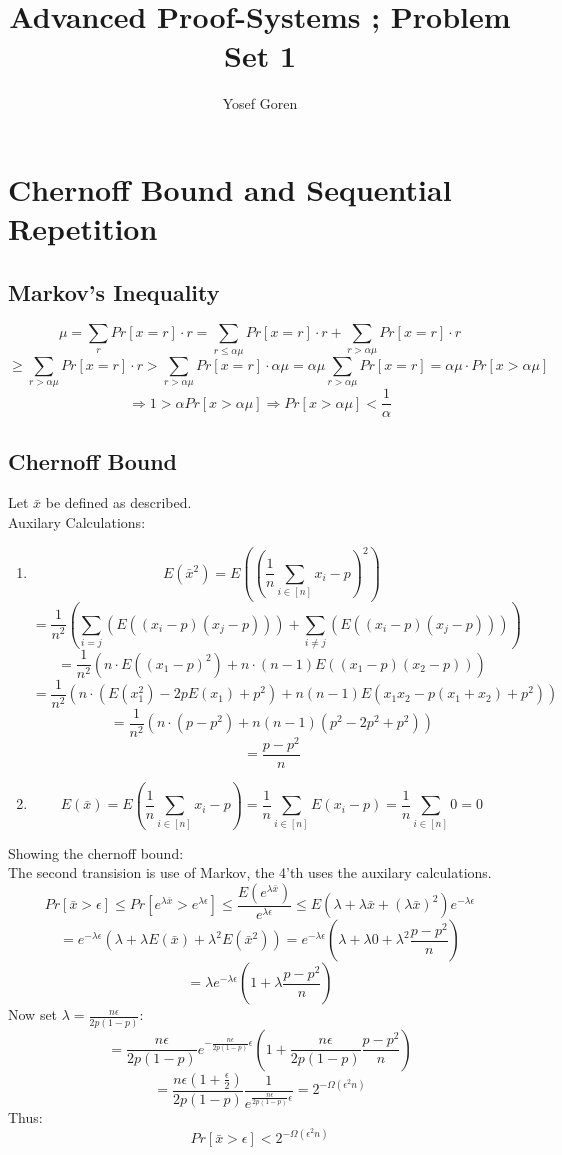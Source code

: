 \documentclass{article}
\begin{document}
\author{Yosef Goren}
\title{Advanced Proof-Systems ; Problem Set 1}
\maketitle

\section{Chernoff Bound and Sequential Repetition}
\subsection{Markov's Inequality}
\[
    \mu = \sum_rPr[x=r]\cdot r
    = \sum_{r\leq \alpha\mu}Pr[x=r]\cdot r + \sum_{r>\alpha\mu}Pr[x=r]\cdot r\]\[
    \geq \sum_{r>\alpha\mu}Pr[x=r]\cdot r> \sum_{r>\alpha\mu}Pr[x=r]\cdot \alpha\mu
    =\alpha\mu\sum_{r>\alpha\mu}Pr[x=r]
    = \alpha\mu\cdot Pr[x>\alpha\mu]\]\[
    \Rightarrow 1>\alpha Pr[x>\alpha\mu]
    \Rightarrow Pr[x>\alpha\mu] < \frac{1}{\alpha}
\]

\subsection{Chernoff Bound}
Let $\bar{x}$ be defined as described.\\
Auxilary Calculations:
\begin{enumerate}
    \item 
    \[
        E(\bar{x}^2)=E((\frac{1}{n}\sum_{i\in[n]}x_i-p)^2)
    \]\[
        =\frac{1}{n^2}(\sum_{i=j}(E((x_i-p)(x_j-p)))+\sum_{i\neq j}(E((x_i-p)(x_j-p))))
    \]\[
        =\frac{1}{n^2}(n\cdot E((x_1-p)^2)
        +n\cdot (n-1)E((x_1-p)(x_2-p)))
    \]\[
        =\frac{1}{n^2}(n\cdot (E(x_1^2)-2pE(x_1)+p^2)
        +n(n-1)E(x_1x_2-p(x_1+x_2)+p^2))
    \]\[
        =\frac{1}{n^2}(n\cdot (p-p^2)
        +n(n-1)(p^2-2p^2+p^2))
    \]\[
        =\frac{p-p^2}{n}
    \]
    \item
    \[
        E(\bar{x})=E(\frac{1}{n}\sum_{i\in[n]}x_i-p)
        =\frac{1}{n}\sum_{i\in[n]}E(x_i-p)
        =\frac{1}{n}\sum_{i\in[n]}0=0
    \]
\end{enumerate}
Showing the chernoff bound:\\
The second transision is use of Markov, the 4'th uses the auxilary calculations.
\[
Pr[\bar{x}>\epsilon]
    \leq Pr[e^{\lambda \bar{x}}>e^{\lambda\epsilon}]
    \leq \frac{E(e^{\lambda \bar{x}})}{e^{\lambda\epsilon}}
    \leq E(\lambda+\lambda\bar{x}+(\lambda\bar{x})^2)e^{-\lambda\epsilon}
\]\[
    =e^{-\lambda\epsilon}(\lambda+\lambda E(\bar{x})+\lambda^2 E(\bar{x}^2))
    =e^{-\lambda\epsilon}(\lambda+\lambda 0+\lambda^2 \frac{p-p^2}{n})
\]\[
    =\lambda e^{-\lambda\epsilon}(1+\lambda \frac{p-p^2}{n})
\]
    Now set $\lambda = \frac{n\epsilon}{2p(1-p)}$:
\[
    =\frac{n\epsilon}{2p(1-p)}
    e^{-\frac{n\epsilon}{2p(1-p)}\epsilon}
    (1+\frac{n\epsilon}{2p(1-p)} \frac{p-p^2}{n})
\]
\[
    =\frac{n\epsilon(1+\frac{\epsilon}{2})}{2p(1-p)}
    \frac{1}{e^{\frac{n\epsilon}{2p(1-p)}\epsilon}}
    =2^{-\Omega(\epsilon^2n)}
\]
Thus:
\[
    Pr[\bar{x}>\epsilon]
    < 2^{-\Omega(\epsilon^2n)}
\]
\end{document}
